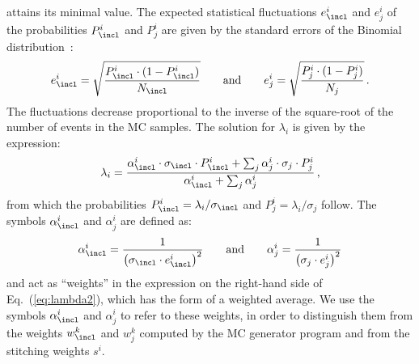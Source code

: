 attains its minimal value.
The expected statistical fluctuations $e_{\incl}^{i}$ and $e_{j}^{i}$ of the probabilities $P_{\incl}^{i}$ and $P_{j}^{i}$
are given by the standard errors of the Binomial distribution~\cite{Cowan:1998ji}:
\begin{equation*}
e_{\incl}^{i} = \sqrt{\frac{P_{\incl}^{i} \cdot (1 - P_{\incl}^{i})}{N_{\incl}}} \qquad \mbox{and} \qquad e_{j}^{i} = \sqrt{\frac{P_{j}^{i} \cdot (1 - P_{j}^{i})}{N_{j}}} \, .
\end{equation*}
The fluctuations decrease proportional to the inverse of the square-root of the number of events in the MC samples.
The solution for $\lambda_{i}$ is given by the expression:
\begin{equation}
\lambda_{i} = \frac{\alpha_{\incl}^{i} \cdot \sigma_{\incl} \cdot P_{\incl}^{i} + \sum_{j} \alpha_{j}^{i} \cdot \sigma_{j} \cdot P_{j}^{i}}{\alpha_{\incl}^{i} + \sum_{j} \alpha_{j}^{i}} \, ,
\label{eq:lambda2}
\end{equation}
from which the probabilities $P_{\incl}^{i} = \lambda_{i}/\sigma_{\incl}$ and $P_{j}^{i} = \lambda_{i}/\sigma_{j}$ follow.
The symbols $\alpha_{\incl}^{i}$ and $\alpha_{j}^{i}$ are defined as:
\begin{equation*}
\alpha_{\incl}^{i} = \frac{1}{\left( \sigma_{\incl} \cdot e_{\incl}^{i} \right)^{2}} \qquad \mbox{and} \qquad \alpha_{j}^{i} = \frac{1}{\left( \sigma_{j} \cdot e_{j}^{i} \right)^{2}}
\end{equation*}
and act as ``weights'' in the expression on the right-hand side of Eq.~(\ref{eq:lambda2}),
which has the form of a weighted average.
We use the symbols $\alpha_{\incl}^{i}$ and $\alpha_{j}^{i}$ to refer to these weights,
in order to distinguish them from the weights $w_{\incl}^{k}$ and $w_{j}^{k}$ computed by the MC generator program
and from the stitching weights $s^{i}$.
